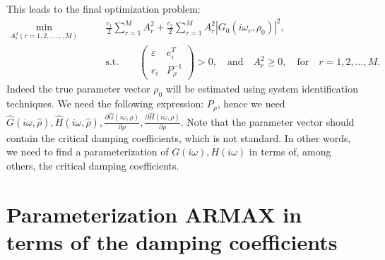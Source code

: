 \documentclass{article}
\begin{document}
This leads to the final optimization problem:
\begin{equation}
\begin{aligned}
\min_{A_r^2 (r=1,2,,\ldots,,M)} \qquad & \frac{c_1}{2} \sum_{r=1}^{M} A_r^2 + \frac{c_2}{2} \sum_{r=1}^{M} A_r^2 |G_0(i\omega_r,\rho_0)|^2, \\
& \text{s.t.} \qquad \begin{pmatrix} \varepsilon & e_i^T \\ e_i & P_\rho^{-1} \end{pmatrix} > 0, \quad \text{and} \quad A_r^2 \geq 0, \quad \text{for} \quad r=1,2,\ldots,M.
\label{eq:optimalinputdesign3}
\end{aligned}
\end{equation}
Indeed the true parameter vector $\rho_0$ will be estimated using system identification techniques. We need the following expression: $P_\rho$, hence we need $\hat{G}(i\omega,\hat{\rho}), \hat{H}(i\omega,\hat{\rho}), \frac{\partial \hat{G}(i\omega,\rho)}{\partial \rho}, \frac{\partial \hat{H}(i\omega,\rho)}{\partial \rho}$. Note that the parameter vector should contain the critical damping coefficients, which is not standard. In other words, we need to find a parameterization of $G(i\omega),H(i\omega)$ in terms of, among others, the critical damping coefficients.  

\section{Parameterization ARMAX in terms of the damping coefficients}
\end{document}
